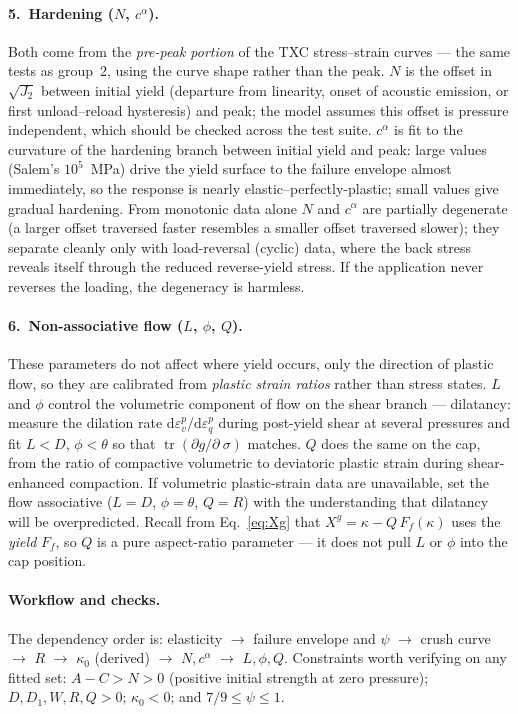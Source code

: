 \documentclass[12pt]{article}
\DeclareMathOperator{\trace}{tr}
\newcommand{\stress}{~\sigma}
\begin{document}
\paragraph{5.\ Hardening ($N$, $c^\alpha$).}
Both come from the \emph{pre-peak portion} of the TXC stress--strain
curves --- the same tests as group~2, using the curve shape rather
than the peak. $N$ is the offset in $\sqrt{J_2}$ between initial
yield (departure from linearity, onset of acoustic emission, or first
unload--reload hysteresis) and peak; the model assumes this offset is
pressure independent, which should be checked across the test suite.
$c^\alpha$ is fit to the curvature of the hardening branch between
initial yield and peak: large values (Salem's $10^5$~MPa) drive the
yield surface to the failure envelope almost immediately, so the
response is nearly elastic--perfectly-plastic; small values give
gradual hardening. From monotonic data alone $N$ and $c^\alpha$ are
partially degenerate (a larger offset traversed faster resembles a
smaller offset traversed slower); they separate cleanly only with
load-reversal (cyclic) data, where the back stress reveals itself
through the reduced reverse-yield stress. If the application never
reverses the loading, the degeneracy is harmless.

\paragraph{6.\ Non-associative flow ($L$, $\phi$, $Q$).}
These parameters do not affect where yield occurs, only the direction
of plastic flow, so they are calibrated from \emph{plastic strain
ratios} rather than stress states. $L$ and $\phi$ control the
volumetric component of flow on the shear branch --- dilatancy:
measure the dilation rate
$\mathrm{d}\varepsilon_v^p/\mathrm{d}\varepsilon_q^p$ during
post-yield shear at several pressures and fit $L < D$,
$\phi < \theta$ so that $\trace(\partial g/\partial\stress)$ matches.
$Q$ does the same on the cap, from the ratio of compactive volumetric
to deviatoric plastic strain during shear-enhanced compaction. If
volumetric plastic-strain data are unavailable, set the flow
associative ($L = D$, $\phi = \theta$, $Q = R$) with the
understanding that dilatancy will be overpredicted. Recall from
Eq.~\eqref{eq:Xg} that $X^g = \kappa - Q\,F_f(\kappa)$ uses the
\emph{yield} $F_f$, so $Q$ is a pure aspect-ratio parameter --- it
does not pull $L$ or $\phi$ into the cap position.

\paragraph{Workflow and checks.}
The dependency order is: elasticity $\to$ failure envelope and $\psi$
$\to$ crush curve $\to$ $R$ $\to$ $\kappa_0$ (derived) $\to$
$N, c^\alpha$ $\to$ $L, \phi, Q$. Constraints worth verifying on any
fitted set: $A - C > N > 0$ (positive initial strength at zero
pressure); $D, D_1, W, R, Q > 0$; $\kappa_0 < 0$; and
$7/9 \le \psi \le 1$.
\end{document}
